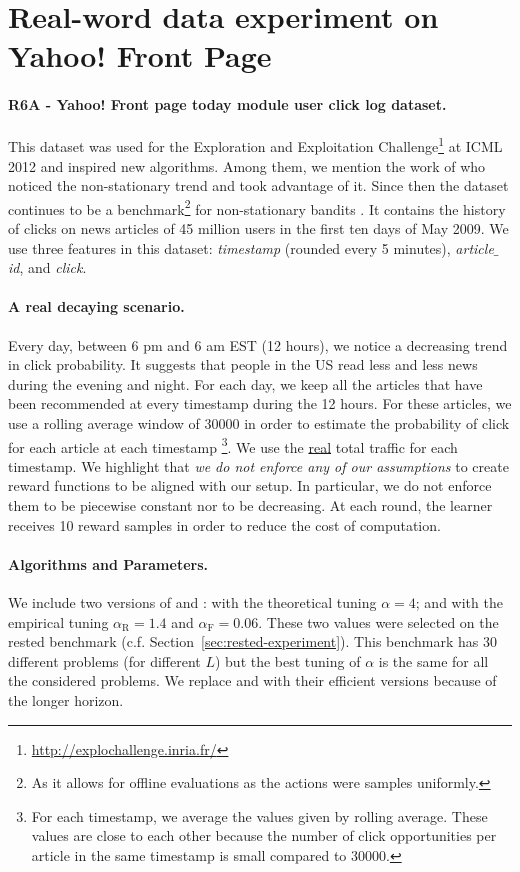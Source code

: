 \section{Real-word data experiment on Yahoo! Front Page}
\label{sec:yahoo}
\paragraph{R6A - Yahoo! Front page today module user click log dataset.} 
This dataset was used for the Exploration and Exploitation Challenge\footnote{\url{http://explochallenge.inria.fr/}} at ICML 2012 and inspired new algorithms. Among them, we mention the work of \citet{traca2015regulating} who noticed the non-stationary trend and took advantage of it. Since then the dataset continues to be a benchmark\footnote{As it allows for offline evaluations as the actions were samples uniformly.} for non-stationary bandits \citep{liu2018change-detection,cao2019nearly}. It contains the history of clicks on news articles of 45 million users in the first ten days of May 2009. We use three features in this dataset: \textit{timestamp} (rounded every 5 minutes), \textit{article$\!\_\!$id}, and \textit{click}. 
 
\paragraph{A real decaying scenario.} Every day, between 6 pm and 6 am EST (12 hours), we notice a decreasing trend in click probability. It suggests that people in the US read less and less news during the evening and night. For each day, we keep all the articles that have been recommended at every timestamp during the 12 hours. For these articles, we use a rolling average window of 30000 in order to estimate the probability of click for each article at each timestamp \footnote{For each timestamp, we average the values given by rolling average. These values are close to each other because the number of click opportunities per article in the same timestamp is small compared to 30000.}. We use the \underline{real} total traffic for each timestamp. We highlight that \textit{we do not enforce any of our assumptions} to create reward functions to be aligned with our setup. In particular, we do not enforce them to be piecewise constant nor to be decreasing. At each round, the learner receives 10 reward samples in order to reduce the cost of computation.

\paragraph{Algorithms and Parameters.} We include two versions of \FEWA and \RAWUCB: with the theoretical tuning $\alpha =4$; and with the empirical tuning $\alpha_{\mathrm{R}} = 1.4$ and $\alpha_{\mathrm{F}} = 0.06$. These two values were selected on the rested benchmark (c.f. Section~\ref{sec:rested-experiment}). This benchmark has 30 different problems (for different $L$) but the best tuning of $\alpha$ is the same for all the considered problems. We replace \RAWUCB and \FEWA with their efficient versions because of the longer horizon. 

